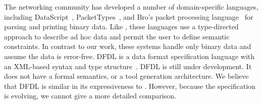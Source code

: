 



The networking community has developed a number of domain-specific
languages, including DataScript~\cite{gpce02}, PacketTypes~\cite{sigcomm00},
and Bro's packet processing
language~\cite{paxson:bro} for parsing and printing binary data.  
Like \padsml{}, these
languages use a type-directed approach to describe ad hoc data and
permit the user to define semantic constraints.  In contrast to our
work, these systems handle only binary data and assume the data is
error-free. DFDL is a data
format specification language with an XML-based syntax and type
structure~\cite{dfdl-proposal,dfdl-primer}. DFDL is still under development.   
It does not have a formal semantics, or a tool
generation architecture. We believe that
DFDL is similar in its expressiveness to \padsc{}.  However, because
the specification is evolving, we cannot give a more
detailed comparison.

